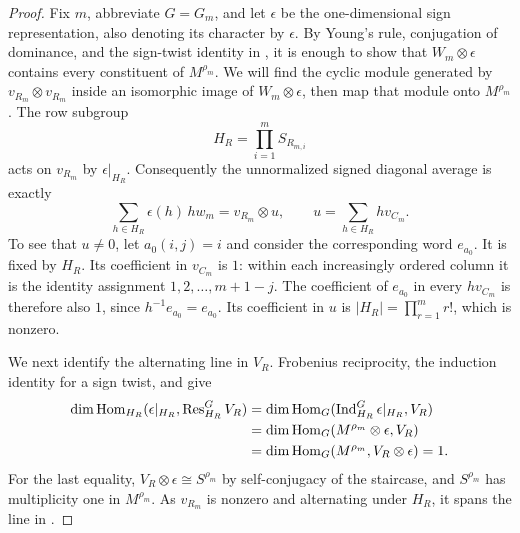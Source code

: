 \begin{proof}
Fix $m$, abbreviate $G=G_m$, and let $\epsilon$ be the one-dimensional
sign representation, also denoting its character by $\epsilon$.
By Young's rule, conjugation of dominance, and the sign-twist identity
in , it is enough to show that
$W_m\otimes\epsilon$ contains every constituent of $M^{\rho_m}$.
We will find the cyclic module generated by
$v_{R_m}\otimes v_{R_m}$ inside an isomorphic image of
$W_m\otimes\epsilon$, then map that module onto $M^{\rho_m}$.
The row subgroup
\[
 H_R=\prod_{i=1}^m S_{R_{m,i}}
\]
acts on $v_{R_m}$ by $\epsilon|_{H_R}$.  Consequently the unnormalized signed
diagonal average is exactly
\begin{equation}
 \sum_{h\in H_R}\epsilon(h)\,h w_m
 =v_{R_m}\otimes u,\qquad
 u=\sum_{h\in H_R}h v_{C_m}.
 \label{dom:signed-average}
\end{equation}
To see that $u\ne0$, let $a_0(i,j)=i$ and consider the corresponding word
$e_{a_0}$.  It is fixed by $H_R$.  Its coefficient in $v_{C_m}$ is $1$:
within each increasingly ordered column it is the identity assignment
$1,2,\ldots,m+1-j$.  The coefficient of $e_{a_0}$ in every $h v_{C_m}$ is
therefore also $1$, since $h^{-1}e_{a_0}=e_{a_0}$.  Its coefficient in $u$ is
$|H_R|=\prod_{r=1}^m r!$, which is nonzero.

We next identify the alternating line in $V_R$.  Frobenius reciprocity,
the induction identity for a sign twist, and  give
\begin{align}
 \dim\operatorname{Hom}_{H_R}(\epsilon|_{H_R},\operatorname{Res}_{H_R}^{G}V_R)
 &=\dim\operatorname{Hom}_G(\operatorname{Ind}_{H_R}^{G}\epsilon|_{H_R},V_R)\notag\\
 &=\dim\operatorname{Hom}_G(M^{\rho_m}\otimes\epsilon,V_R)\notag\\
 &=\dim\operatorname{Hom}_G(M^{\rho_m},V_R\otimes\epsilon)=1.
 \label{dom:alternating-line}
\end{align}
For the last equality, $V_R\otimes\epsilon\cong S^{\rho_m}$ by
self-conjugacy of the staircase, and $S^{\rho_m}$ has multiplicity one in
$M^{\rho_m}$.  As $v_{R_m}$ is nonzero and alternating under $H_R$, it spans
the line in .


\end{proof}
